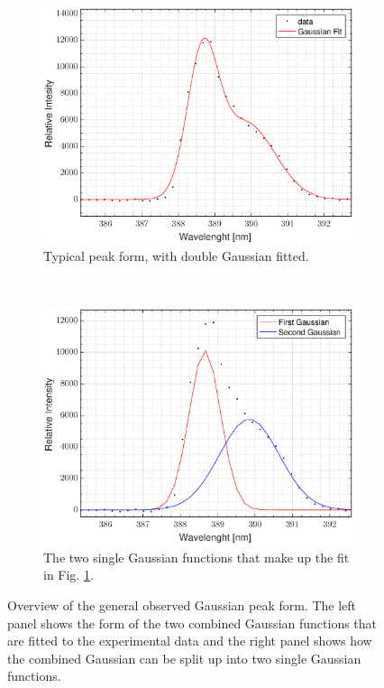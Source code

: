 \begin{figure}[h!]
    \centering
        \begin{subfigure}{0.5\textwidth}
        \centering
        \includegraphics[width=\linewidth]{figures/typisk_dobbelt_gauss.eps}
        \caption{Typical peak form, with double Gaussian fitted.}
        \label{fig: double gauss}
    \end{subfigure}%
    ~
    \begin{subfigure}{0.5\textwidth}
        \centering
        \includegraphics[width=\linewidth]{figures/to_enkelt_gauss.eps}
        \caption{The two single Gaussian functions that make up the fit in Fig. \ref{fig: double gauss}.}
        \label{fig: two single gauss}
    \end{subfigure}%
    \caption{Overview of the general observed Gaussian peak form. The left panel shows the form of the two combined Gaussian functions that are fitted to the experimental data and the right panel shows how the combined Gaussian can be split up into two single Gaussian functions. }
    \label{fig: Demo gauss peaks}
\end{figure}


